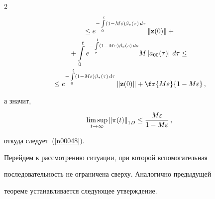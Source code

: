 \begin{multicols}{2}
\begin{multline*}
{}\le 


 e^{-\int\limits_0^t \left(1- M\varepsilon\right) \beta_* (\tau)\, d\tau}\left\|{\bf z}(0)\right\| +{}\\[-1pt]


 {}+


\int\limits_0^t e^{-\int\limits_\tau^t\left(1- M\varepsilon\right) \beta_* (s)\, d


s}  M \left|a_{00}(\tau)\right| \, d\tau  \le {}\\[-1pt]


{}\le  e^{-\int\limits_0^t  \left(1- M\varepsilon\right) \beta_* (\tau)\, d\tau}\left\|{\bf z}(0)\right\| +


 \fr{M\varepsilon}{1-M\varepsilon}\,,




\end{multline*}


а значит,





\vspace*{-1pt}





\noindent


\begin{equation*}


\limsup_{t \to \infty} \left\|{\bf \pi}(t)\right\|_{1D} \le


 \frac{M\varepsilon}{1-M\varepsilon}\,,




\end{equation*}


откуда следует~(\ref{n00048}).





\bigskip





Перейдем к рассмотрению ситуации, при которой вспомогательная


последовательность не ограничена сверху. Аналогично предыдущей


теореме  устанавливается следующее утверждение.





\medskip





\noindent



\end{multicols}
